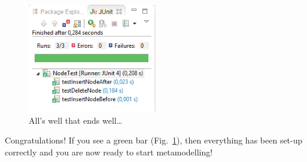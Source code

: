 \begin{enumerate}
\begin{figure}[htbp]
	\centering
  \includegraphics[width=0.5\textwidth]{pics/installationAndSetup/eclipse_testsuiterun.png}
	\caption{All's well that ends well\ldots}
	\label{fig_eclipsetestsuiterun}
\end{figure}
\end{enumerate}

Congratulations!  If you see a green bar  (Fig.~\ref{fig_eclipsetestsuiterun}), then everything has been set-up correctly and you are now ready to start metamodelling!


